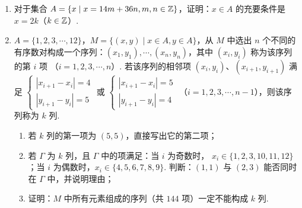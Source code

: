 \documentclass[a4paper,11pt]{article}
\begin{document}
\begin{enumerate}
\fi

\ansspace[8]

\item 对于集合 $A=\{x\mid x=14m+36n,m,n\in\mathbb{Z}\}$，证明：$x\in A$ 的充要条件是
$x=2k$（$k\in\mathbb{Z}$）.

\ifanswer
\solbegin
{}
\solend

\fi

\ansspace[6]

\item $A=\{1,2,3,\cdots,12\}$，$M=\{(x,y)\mid x\in A,y\in A\}$，从 $M$ 中选出 $n$ 个不同的
有序数对构成一个序列：$(x_1,y_1),\cdots,(x_n,y_n)$，其中 $(x_i,y_i)$ 称为该序列的第 $i$ 项
（$i=1,2,3,\cdots,n$）. 若该序列的相邻项 $(x_i,y_i)$、$(x_{i+1},y_{i+1})$ 满足
$\begin{cases}|x_{i+1}-x_i|=4\\ |y_{i+1}-y_i|=5\end{cases}$ 或
$\begin{cases}|x_{i+1}-x_i|=5\\ |y_{i+1}-y_i|=4\end{cases}$
（$i=1,2,3,\cdots,n-1$），则该序列称为 $k$ 列.

\begin{enumerate}[label=(\arabic*)]
\item 若 $k$ 列的第一项为 $(5,5)$，直接写出它的第二项；
\item 若 $\varGamma$ 为 $k$ 列，且 $\varGamma$ 中的项满足：当 $i$ 为奇数时，
$x_i\in\{1,2,3,10,11,12\}$；当 $i$ 为偶数时，$x_i\in\{4,5,6,7,8,9\}$.
判断：$(1,1)$ 与 $(2,3)$ 能否同时在 $\varGamma$ 中，并说明理由；
\item 证明：$M$ 中所有元素组成的序列（共 $144$ 项）一定不能构成 $k$ 列.
\end{enumerate}


\end{enumerate}
\end{document}
